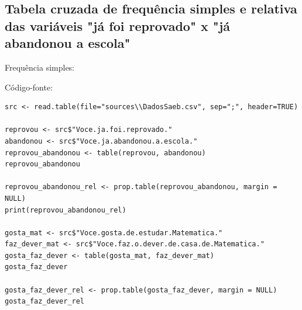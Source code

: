 \documentclass[17pt]{extarticle}
\begin{document}
\newpage
\subsection{Tabela cruzada de frequência simples e relativa das variáveis "já foi reprovado" x "já abandonou a escola"}
Frequência simples:
\begin{table}[H]
\end{table}
\begin{table}[H]
\end{table}
Código-fonte:
\begin{lstlisting}
src <- read.table(file="sources\\DadosSaeb.csv", sep=";", header=TRUE)

reprovou <- src$"Voce.ja.foi.reprovado."
abandonou <- src$"Voce.ja.abandonou.a.escola."
reprovou_abandonou <- table(reprovou, abandonou)
reprovou_abandonou

reprovou_abandonou_rel <- prop.table(reprovou_abandonou, margin = NULL)
print(reprovou_abandonou_rel)

gosta_mat <- src$"Voce.gosta.de.estudar.Matematica."
faz_dever_mat <- src$"Voce.faz.o.dever.de.casa.de.Matematica."
gosta_faz_dever <- table(gosta_mat, faz_dever_mat)
gosta_faz_dever

gosta_faz_dever_rel <- prop.table(gosta_faz_dever, margin = NULL)
gosta_faz_dever_rel

\end{lstlisting}
\end{document}
